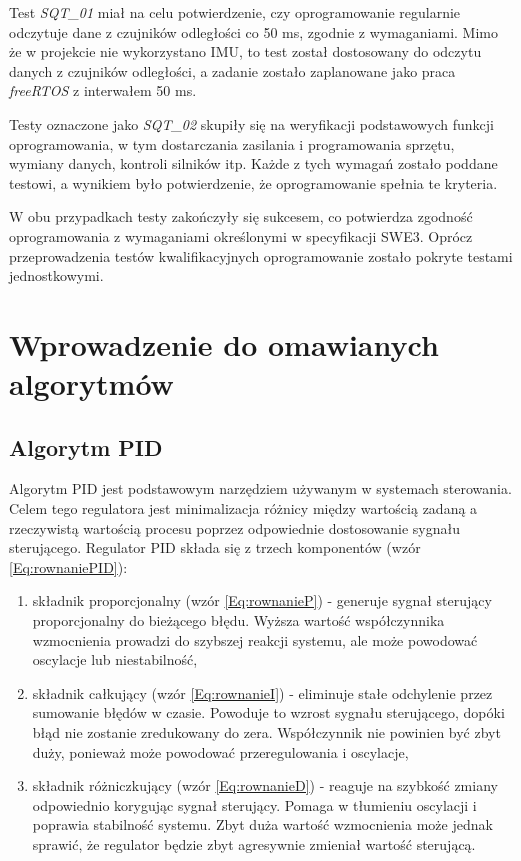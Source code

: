 \documentclass[12pt,twoside]{article}
\begin{document}
Test \textit{SQT\_01} miał na celu potwierdzenie, czy oprogramowanie regularnie odczytuje dane z czujników odległości co 50 ms, zgodnie z wymaganiami. Mimo że w projekcie nie wykorzystano IMU, to test został dostosowany do odczytu danych z czujników odległości, a zadanie zostało zaplanowane jako praca \textit{freeRTOS} \cite{freeRTOS} z interwałem 50 ms.

Testy oznaczone jako \textit{SQT\_02} skupiły się na weryfikacji podstawowych funkcji oprogramowania, w tym dostarczania zasilania i programowania sprzętu, wymiany danych, kontroli silników itp. Każde z tych wymagań zostało poddane testowi, a wynikiem było potwierdzenie, że oprogramowanie spełnia te kryteria.

W obu przypadkach testy zakończyły się sukcesem, co potwierdza zgodność oprogramowania z wymaganiami określonymi w specyfikacji SWE3. Oprócz przeprowadzenia testów kwalifikacyjnych oprogramowanie zostało pokryte testami jednostkowymi.

\clearpage

\section{Wprowadzenie do omawianych algorytmów}

\subsection{Algorytm PID}
Algorytm PID \cite{PID} jest podstawowym narzędziem używanym w systemach sterowania. Celem tego regulatora jest minimalizacja różnicy między wartością zadaną a rzeczywistą wartością procesu poprzez odpowiednie dostosowanie sygnału sterującego. Regulator PID składa się z trzech komponentów (wzór \ref{Eq:rownaniePID}):



\begin{enumerate}[label=\alph*), leftmargin=1.25cm]
	\item składnik proporcjonalny (wzór \ref{Eq:rownanieP}) - generuje sygnał sterujący proporcjonalny do bieżącego błędu. Wyższa wartość współczynnika wzmocnienia prowadzi do szybszej reakcji systemu, ale może powodować oscylacje lub niestabilność,
	
	\item składnik całkujący (wzór \ref{Eq:rownanieI}) - eliminuje stałe odchylenie przez sumowanie błędów w czasie. Powoduje to wzrost sygnału sterującego, dopóki błąd nie zostanie zredukowany do zera. Współczynnik nie powinien być zbyt duży, ponieważ może powodować przeregulowania i oscylacje,
	
	\item składnik różniczkujący (wzór \ref{Eq:rownanieD}) - reaguje na szybkość zmiany odpowiednio korygując sygnał sterujący. Pomaga w tłumieniu oscylacji i poprawia stabilność systemu. Zbyt duża wartość wzmocnienia może jednak sprawić, że regulator będzie zbyt agresywnie zmieniał wartość sterującą.
\end{enumerate}
\end{document}
